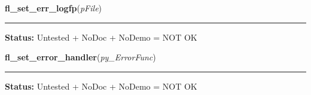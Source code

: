     \label{xformslib:library:fl_set_err_logfp}

    \vspace{0.5ex}

\hspace{.8\funcindent}\begin{boxedminipage}{\funcwidth}

    \raggedright \textbf{fl\_set\_err\_logfp}(\textit{pFile})

    \vspace{-1.5ex}

    \rule{\textwidth}{0.5\fboxrule}
\setlength{\parskip}{2ex}
\setlength{\parskip}{1ex}
\textbf{Status:} Untested + NoDoc + NoDemo = NOT OK



    \end{boxedminipage}

    \label{xformslib:library:fl_set_error_handler}

    \vspace{0.5ex}

\hspace{.8\funcindent}\begin{boxedminipage}{\funcwidth}

    \raggedright \textbf{fl\_set\_error\_handler}(\textit{py\_ErrorFunc})

    \vspace{-1.5ex}

    \rule{\textwidth}{0.5\fboxrule}
\setlength{\parskip}{2ex}
\setlength{\parskip}{1ex}
\textbf{Status:} Untested + NoDoc + NoDemo = NOT OK



    \end{boxedminipage}

    \label{xformslib:library:fl_get_cmdline_args}

    \vspace{0.5ex}

